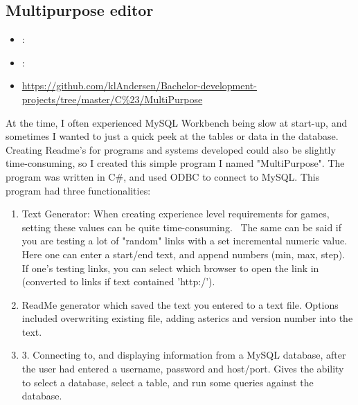 \subsection{Multipurpose editor}
\label{sec:multipurpose}
\begin{itemize} 
	\item {}: 
	\item {}: 
	\item {} \url{https://github.com/klAndersen/Bachelor-development-projects/tree/master/C%23/MultiPurpose}
\end{itemize} 
At the time, I often experienced MySQL Workbench being slow at start-up, and sometimes I wanted to just a quick peek at the tables or data in the database. 
Creating Readme's for programs and systems developed could also be slightly time-consuming, so I created this simple program I named "MultiPurpose".
\vspace{0.5em}\newline
The program was written in C\#, and used ODBC to connect to MySQL. This program had three functionalities:
\begin{enumerate}
	\item Text Generator: When creating experience level requirements for games, setting these values can be quite time-consuming. 
	The same can be said if you are testing a lot of "random" links with a set incremental numeric value. 
	Here one can enter a start/end text, and append numbers (min, max, step). 
	If one's testing links, you can select which browser to open the link in (converted to links if text contained 'http:/').
	\item ReadMe generator which saved the text you entered to a text file. 
	Options included overwriting existing file, adding asterics and version number into the text.
	\item 3. Connecting to, and displaying information from a MySQL database, after the user had entered a username, password and host/port. 
	Gives the ability to select a database, select a table, and run some queries against the database.
\end{enumerate}
